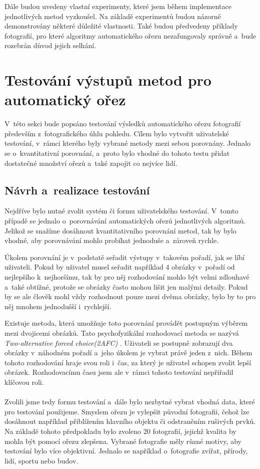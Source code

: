 Dále budou uvedeny vlastní experimenty, které jsem během implementace jednotlivých metod vyzkoušel. Na základě experimentů budou názorně demonstrovány některé důležité vlastnosti. Také budou předvedeny příklady fotografií, pro které algoritmy automatického ořezu nezafungovaly správně a~bude rozebrán důvod jejich selhání.

\section{Testování výstupů metod pro automatický ořez}
V~této sekci bude popsáno testování výsledků automatického ořezu fotografií především z~fotografického úhlu pohledu. Cílem bylo vytvořit uživatelské testování, v~rámci kterého byly vybrané metody mezi sebou porovnány. Jednalo se o~kvantitativní porovnání, a~proto bylo vhodné do tohoto testu přidat dostatečné množství ořezů a~také zapojit co nejvíce lidí.

\subsection{Návrh a~realizace testování}
Nejdříve bylo nutné zvolit systém či formu uživatelského testování. V~tomto případě se jednalo o~porovnávání automatických ořezů jednotlivých algoritmů. Jelikož se snažíme dosáhnout kvantitativního porovnání metod, tak by bylo vhodné, aby porovnávání mohlo probíhat jednoduše a~zároveň rychle.

Úkolem porovnání je v~podstatě seřadit výstupy v~takovém pořadí, jak se líbí uživateli. Pokud by uživatel musel seřadit například 4 obrázky v~pořadí od nejlepšího k~nejhoršímu, tak by pro něj rozhodování mohlo být velmi zdlouhavé a~také obtížné, protože se obrázky často mohou lišit jen malými detaily. Pokud by se ale člověk mohl vždy rozhodnout pouze mezi dvěma obrázky, bylo by to pro něj mnohem jednodušší i~rychlejší.

Existuje metoda, která umožňuje toto porovnání provádět postupným výběrem mezi dvojicemi obrázků. Tato psychofyzikální rozhodovací metoda se nazývá \emph{Two-alternative forced choice(2AFC)} \cite{David1988}. Uživateli se postupně zobrazují dva obrázky v~náhodném pořadí a~jeho úkolem je vybrat právě jeden z~nich. Během tohoto rozhodování hraje svou roli i~čas, za který je uživatel schopen zvolit lepší obrázek. Rozhodovacímu času jsem ale v~rámci tohoto testování nepřiřadil klíčovou roli.

\paragraph{}
Zvolili jsme tedy formu testování a~dále bylo nezbytné vybrat vhodná data, které pro testování použijeme. Smyslem ořezu je vylepšit původní fotografii, čehož lze dosáhnout například přiblížením hlavního objektu či odstraněním rušivých prvků. Na základě tohoto předpokladu bylo zvoleno 20 fotografií, jejichž kvalita by mohla být pomocí ořezu zlepšena. Vybrané fotografie měly různé motivy, aby testování bylo více objektivní. Jednalo se například o~fotografie zvířat, přírody, lidí, sportu nebo budov.


